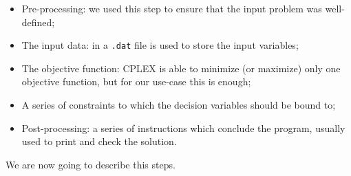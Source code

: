 \begin{itemize}
  \item Pre-processing: we used this step to ensure that the input problem was
    well-defined;
  \item The input data: in  a \texttt{.dat} file is used to store the
    input variables;
  \item The objective function: CPLEX is able to minimize (or maximize) only
    one objective function, but for our use-case this is enough;
  \item A series of constraints to which the decision variables should be bound
    to;
  \item Post-processing: a series of instructions which conclude the program,
    usually used to print and check the solution. 
\end{itemize}
We are now going to describe this steps. 
%
%
